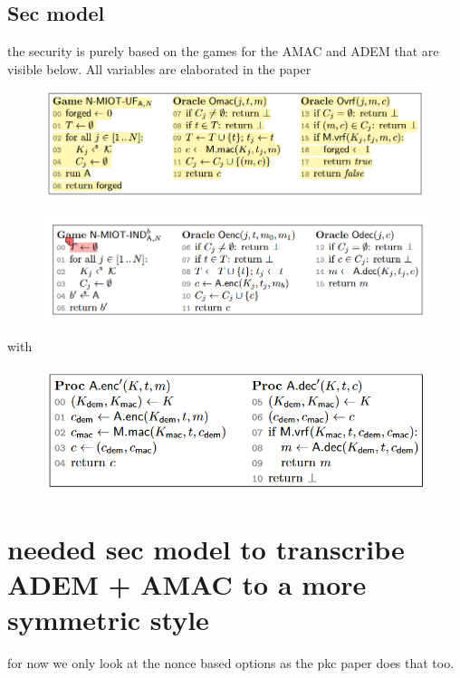 \documentclass{article}
\begin{document}
\subsection{Sec model}
the security is purely based on the games for the AMAC and ADEM that are visible below. All variables are elaborated in the paper
\begin{figure}[H]
    \centering
    \includegraphics[scale = 0.5]{gebrabbel images/game mac.png}
\end{figure}
\begin{figure}[H]
    \centering
    \includegraphics[scale = 0.5]{gebrabbel images/game adem.png}
\end{figure}
with
\begin{figure}[H]
    \centering
    \includegraphics[scale = 0.5]{gebrabbel images/adem amac.png}
\end{figure}


\newpage
\section{needed sec model to transcribe ADEM + AMAC to a more symmetric style}
for now we only look at the nonce based options as the pkc paper does that too.
\end{document}
